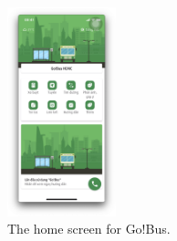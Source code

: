 \begin{figure}[H]
    \centering
    \includegraphics[width=0.28\textwidth]{assets/images/Research/Bus/gobus_home.png}
    \caption{The home screen for Go!Bus.}
    \label{fig:gobus_homescreen}
\end{figure}


